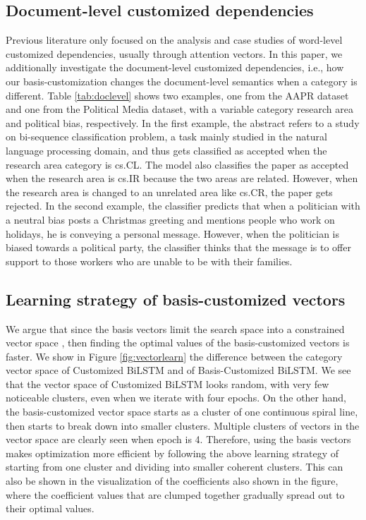 \documentclass[11pt,a4paper]{article}
\begin{document}
\subsection{Document-level customized dependencies}

Previous literature only focused on the analysis \cite{amplayo2018cold} and case studies \cite{chen2016neural} of word-level customized dependencies, usually through attention vectors. In this paper, we additionally investigate the document-level customized dependencies, i.e., how our basis-customization changes the document-level semantics when a category is different. Table \ref{tab:doclevel} shows two examples, one from the AAPR dataset and one from the Political Media dataset, with a variable category research area and political bias, respectively. In the first example, the abstract refers to a study on bi-sequence classification problem, a task mainly studied in the natural language processing domain, and thus gets classified as accepted when the research area category is cs.CL. The model also classifies the paper as accepted when the research area is cs.IR because the two areas are related. However, when the research area is changed to an unrelated area like cs.CR, the paper gets rejected. In the second example, the classifier predicts that when a politician with a neutral bias posts a Christmas greeting and mentions people who work on holidays, he is conveying a personal message. However, when the politician is biased towards a political party, the classifier thinks that the message is to offer support to those workers who are unable to be with their families.

\subsection{Learning strategy of basis-customized vectors}

We argue that since the basis vectors  limit the search space into a constrained vector space , then finding the optimal values of the basis-customized vectors is faster. We show in Figure \ref{fig:vectorlearn} the difference between the category vector space of Customized BiLSTM and of Basis-Customized BiLSTM. We see that the vector space of Customized BiLSTM looks random, with very few noticeable clusters, even when we iterate with four epochs. On the other hand, the basis-customized vector space starts as a cluster of one continuous spiral line, then starts to break down into smaller clusters. Multiple clusters of vectors in the vector space are clearly seen when epoch is 4. Therefore, using the basis vectors makes optimization more efficient by following the above learning strategy of starting from one cluster and dividing into smaller coherent clusters. This can also be shown in the visualization of the  coefficients also shown in the figure, where the coefficient values that are clumped together gradually spread out to their optimal values.
\end{document}

